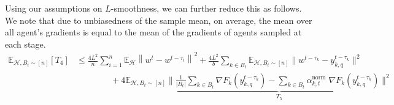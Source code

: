 \documentclass{article}
\begin{document}
Using our assumptions on $L$-smoothness, we can further reduce this as follows. We note that due to unbiasedness of the sample mean, on average, the mean over all agent's gradients is equal to the mean of the gradients of agents sampled at each stage.
\begin{align*}
    \mathbb{E}_{\mathcal{H}, B_t\sim [n]}[T_4]
    &\leq
    \frac{4L^2}{n}\sum_{i=1}^n \mathbb{E}_{\mathcal{H}}\left\|
    w^t - w^{t-\tau_i}
    \right\|^2 +
        \frac{4L^2}{b}
        \sum_{k \in B_t}
        {
        \mathbb{E}_{\mathcal{H}, B_t \sim [n]}
        \Bigg\| w^{t-\tau_k} - y_{k, q}^{t - \tau_k} \Bigg\|^2
        }      
    \\
        &\qquad\qquad +
        4 \mathbb{E}_{\mathcal{H}, B_t \sim [n]}
        \underbrace{
        \Bigg\| 
        \frac{1}{|B_t|} \sum_{k \in B_t}{
             \nabla F_k(y_{k, q}^{t - \tau_k})
        }
        -
        \sum_{k \in B_t}{
            \alpha^{\text{norm}}_{k, t} \; \nabla F_k(y_{k, q}^{t - \tau_k})
        }
        \Bigg\|^2
        }_{T_5}
\end{align*}
\end{document}
